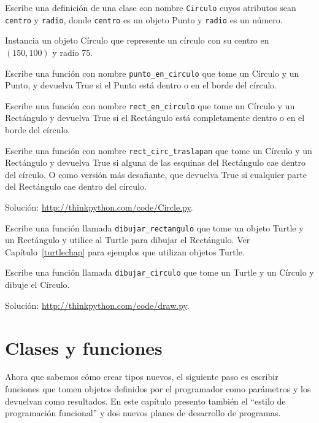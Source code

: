 \documentclass[10pt]{book}
\begin{document}
\begin{exercise}

Escribe una definición de una clase con nombre {\tt Circulo} cuyos atributos sean
{\tt centro} y {\tt radio}, donde {\tt centro} es un objeto Punto
y {\tt radio} es un número.

Instancia un objeto Círculo que represente un círculo con su centro
en $(150, 100)$ y radio 75.

Escribe una función con nombre \verb"punto_en_circulo" que tome un Círculo y
un Punto, y devuelva True si el Punto está dentro o en el borde del
círculo.

Escribe una función con nombre \verb"rect_en_circulo" que tome un Círculo y un
Rectángulo y devuelva True si el Rectángulo está completamente dentro o en el borde
del círculo.

Escribe una función con nombre \verb"rect_circ_traslapan" que tome un Círculo
y un Rectángulo y devuelva True si alguna de las esquinas del Rectángulo cae
dentro del círculo.  O como versión más desafiante, que devuelva True si
cualquier parte del Rectángulo cae dentro del círculo.

Solución: \url{http://thinkpython.com/code/Circle.py}.

\end{exercise}


\begin{exercise}

Escribe una función llamada \verb"dibujar_rectangulo" que tome un objeto Turtle
y un Rectángulo y utilice al Turtle para dibujar el Rectángulo.  Ver
Capítulo~\ref{turtlechap} para ejemplos que utilizan objetos Turtle.

Escribe una función llamada \verb"dibujar_circulo" que tome un Turtle y
un Círculo y dibuje el Círculo.

Solución: \url{http://thinkpython.com/code/draw.py}.

\end{exercise}



\chapter{Clases y funciones}
\label{time}

Ahora que sabemos cómo crear tipos nuevos, el siguiente
paso es escribir funciones que tomen objetos definidos por el programador
como parámetros y los devuelvan como resultados.  En este capítulo
presento también el ``estilo de programación funcional'' y dos nuevos
planes de desarrollo de programas.
\end{document}
